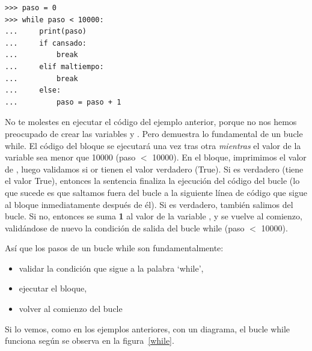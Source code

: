 \begin{listingignore}
\begin{verbatim}
>>> paso = 0
>>> while paso < 10000:
...     print(paso)
...     if cansado:
...         break
...     elif maltiempo:
...         break
...     else:
...         paso = paso + 1
\end{verbatim}
\end{listingignore}

No te molestes en ejecutar el código del ejemplo anterior, porque no nos hemos preocupado de crear las variables  y .  Pero demuestra lo fundamental de un bucle while.  El código del bloque se ejecutará una vez tras otra \emph{mientras} el valor de la variable  sea menor que 10000 (paso $<$ 10000).  En el bloque, imprimimos el valor de , luego validamos si  or  tienen el valor verdadero (True). Si  es verdadero (tiene el valor True), entonces la sentencia  finaliza la ejecución del código del bucle (lo que sucede es que saltamos fuera del bucle a la siguiente línea de código que sigue al bloque inmediatamente después de él).  Si  es verdadero, también salimos del bucle.  Si no, entonces se suma \textbf{1} al valor de la variable , y se vuelve al comienzo, validándose de nuevo la condición de salida del bucle while (paso $<$ 10000).
\par
\noindent
Así que los pasos de un bucle while son fundamentalmente:

{\renewcommand{\labelitemi}{$\triangleright$}
\begin{itemize}
\item validar la condición que sigue a la palabra `while',
\item ejecutar el bloque,
\item volver al comienzo del bucle
\end{itemize}}

Si lo vemos, como en los ejemplos anteriores, con un diagrama, el bucle while funciona según se observa en la figura~\ref{while}.


